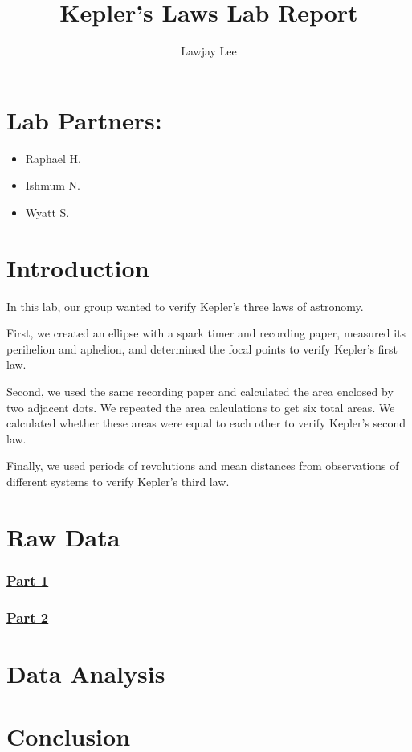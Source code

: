 \documentclass[fleqn]{article}
\title{Kepler's Laws Lab Report}
\author{Lawjay Lee}
\date{}
\begin{document}
\maketitle

\section*{Lab Partners:}
\begin{itemize}
	\item Raphael H.
	\item Ishmum N.
	\item Wyatt S.
\end{itemize}

\section*{Introduction}
In this lab, our group wanted to verify Kepler's three laws of astronomy.

First, we created an ellipse with a spark timer and recording paper, measured its perihelion and aphelion, and determined the focal points to verify Kepler's first law.

Second, we used the same recording paper and calculated the area enclosed by two adjacent dots. We repeated the area calculations to get six total areas. We calculated whether these areas were equal to each other to verify Kepler's second law.

Finally, we used periods of revolutions and mean distances from observations of different systems to verify Kepler's third law.
\section*{Raw Data}
\subsubsection*{\underline{Part 1}}

\subsubsection*{\underline{Part 2}}

\section*{Data Analysis}

\section*{Conclusion}
\end{document}
